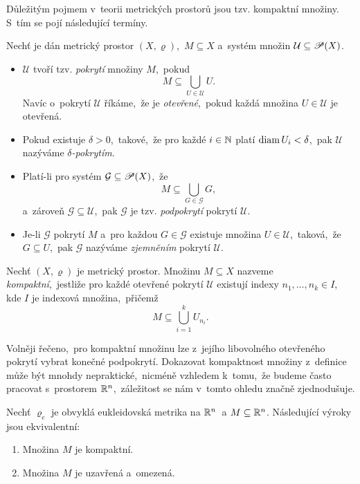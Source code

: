 Důležitým pojmem v~teorii metrických prostorů jsou tzv. kompaktní množiny. S~tím se pojí následující termíny.
\begin{definition}\label{def:delta-pokryti-zjemneni}
    Nechť je dán metrický prostor $(X,\varrho)$,~$M\subseteq X$ a~systém množin $\mathcal{U}\subseteq\mathscr{P}(X)$.
    \begin{itemize}
        \item $\mathcal{U}$ tvoří tzv. \emph{pokrytí} množiny $M$,~pokud
        \[M\subseteq\bigcup_{U\in\mathcal{U}} U.\]
        Navíc o~pokrytí $\mathcal{U}$ říkáme,~že je \emph{otevřené},~pokud každá množina $U\in\mathcal{U}$ je otevřená.
        \item Pokud existuje $\delta>0$,~takové,~že pro každé $i\in\mathbb{N}$ platí $\operatorname{diam}{U_i}<\delta$,~pak $\mathcal{U}$ nazýváme \emph{$\delta$-pokrytím}.
        \item Platí-li pro systém $\mathcal{G}\subseteq\mathscr{P}(X)$,~že
        \[M\subseteq\bigcup_{G\in\mathcal{G}} G,\]
        a~zároveň $\mathcal{G}\subseteq\mathcal{U}$,~pak $\mathcal{G}$ je tzv. \emph{podpokrytí} pokrytí $\mathcal{U}$.
        \item Je-li $\mathcal{G}$ pokrytí $M$ a~pro každou $G\in\mathcal{G}$ existuje množina $U\in\mathcal{U}$,~taková,~že $G\subseteq U$,~pak $\mathcal{G}$ nazýváme \emph{zjemněním} pokrytí $\mathcal{U}$. 
    \end{itemize}
\end{definition}
\begin{definition}\label{def:kompaktni-mnozina}
    Nechť $(X,\varrho)$ je metrický prostor. Množinu $M\subseteq X$ nazveme \emph{kompaktní},~jestliže pro každé otevřené pokrytí $\mathcal{U}$ existují indexy $n_1,\ldots,n_k\in I$, kde $I$ je indexová množina,~přičemž
    \[M\subseteq\bigcup_{i=1}^k U_{n_i}.\]
\end{definition}
Volněji řečeno,~pro kompaktní množinu lze z~jejího libovolného otevřeného pokrytí vybrat konečné podpokrytí. Dokazovat kompaktnost množiny z~definice může být mnohdy nepraktické,~nicméně vzhledem k~tomu,~že budeme často pracovat s~prostorem $\mathbb{R}^n$,~záležitost se nám v~tomto ohledu značně zjednodušuje.
\begin{theorem}\label{thm:heine-borel}
    Nechť $\varrho_e$ je obvyklá eukleidovská metrika na $\mathbb{R}^n$~a $M\subseteq\mathbb{R}^n$. Následující výroky jsou ekvivalentní:
    \begin{enumerate}[label=(\roman*)]
        \item Množina $M$ je kompaktní.
        \item Množina $M$ je uzavřená a~omezená.
    \end{enumerate}
\end{theorem}
